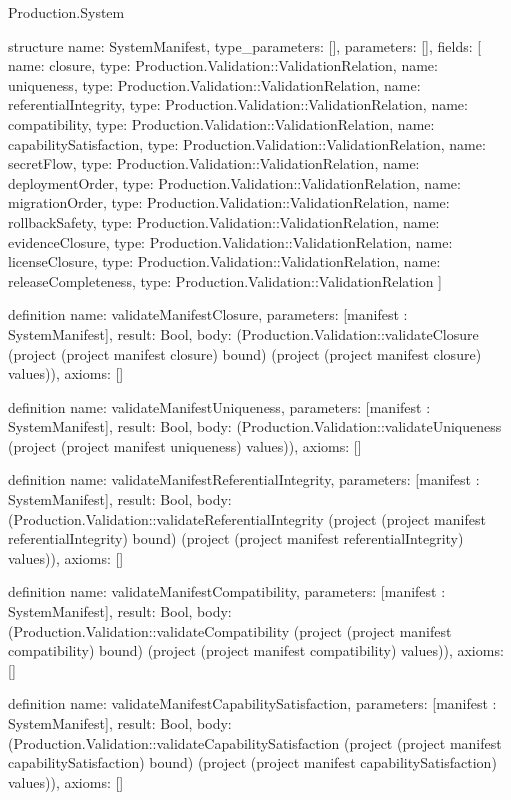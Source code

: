\begin{lexlean}{Production.System}
\begin{semanticmodule}
structure{
  name: SystemManifest,
  type_parameters: [],
  parameters: [],
  fields: [
    {name: closure, type: Production.Validation::ValidationRelation},
    {name: uniqueness, type: Production.Validation::ValidationRelation},
    {name: referentialIntegrity, type: Production.Validation::ValidationRelation},
    {name: compatibility, type: Production.Validation::ValidationRelation},
    {name: capabilitySatisfaction, type: Production.Validation::ValidationRelation},
    {name: secretFlow, type: Production.Validation::ValidationRelation},
    {name: deploymentOrder, type: Production.Validation::ValidationRelation},
    {name: migrationOrder, type: Production.Validation::ValidationRelation},
    {name: rollbackSafety, type: Production.Validation::ValidationRelation},
    {name: evidenceClosure, type: Production.Validation::ValidationRelation},
    {name: licenseClosure, type: Production.Validation::ValidationRelation},
    {name: releaseCompleteness, type: Production.Validation::ValidationRelation}
  ]
}

definition{
  name: validateManifestClosure,
  parameters: [manifest : SystemManifest],
  result: Bool,
  body: (Production.Validation::validateClosure (project (project manifest closure) bound) (project (project manifest closure) values)),
  axioms: []
}

definition{
  name: validateManifestUniqueness,
  parameters: [manifest : SystemManifest],
  result: Bool,
  body: (Production.Validation::validateUniqueness (project (project manifest uniqueness) values)),
  axioms: []
}

definition{
  name: validateManifestReferentialIntegrity,
  parameters: [manifest : SystemManifest],
  result: Bool,
  body: (Production.Validation::validateReferentialIntegrity (project (project manifest referentialIntegrity) bound) (project (project manifest referentialIntegrity) values)),
  axioms: []
}

definition{
  name: validateManifestCompatibility,
  parameters: [manifest : SystemManifest],
  result: Bool,
  body: (Production.Validation::validateCompatibility (project (project manifest compatibility) bound) (project (project manifest compatibility) values)),
  axioms: []
}

definition{
  name: validateManifestCapabilitySatisfaction,
  parameters: [manifest : SystemManifest],
  result: Bool,
  body: (Production.Validation::validateCapabilitySatisfaction (project (project manifest capabilitySatisfaction) bound) (project (project manifest capabilitySatisfaction) values)),
  axioms: []
}


\end{semanticmodule}
\end{lexlean}
